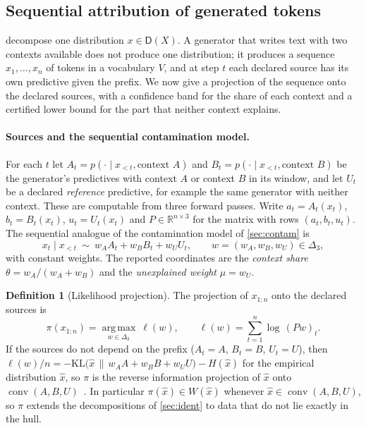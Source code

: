 \documentclass[11pt]{article}
\theoremstyle{definition}
\newtheorem{definition}[theorem]{Definition}
\theoremstyle{remark}
\newcommand{\D}{\mathsf{D}}
\begin{document}
\subsection{Sequential attribution of generated tokens}\label{sec:seqattr}

 decompose one distribution $x\in\D(X)$. A generator that writes text
with two contexts available does not produce one distribution; it produces a sequence
$x_1,\dots,x_n$ of tokens in a vocabulary $V$, and at step $t$ each declared source has its own
predictive given the prefix. We now give a projection of the sequence onto the declared sources,
with a confidence band for the share of each context and a certified lower bound for the part that
neither context explains.

\paragraph{Sources and the sequential contamination model.} For each $t$ let
$A_t=p(\cdot\mid x_{<t},\text{context }A)$ and $B_t=p(\cdot\mid x_{<t},\text{context }B)$ be the
generator's predictives with context $A$ or context $B$ in its window, and let $U_t$ be a declared
\emph{reference} predictive, for example the same generator with neither context. These are
computable from three forward passes. Write $a_t=A_t(x_t)$, $b_t=B_t(x_t)$, $u_t=U_t(x_t)$ and
$P\in\mathbb{R}^{n\times3}$ for the matrix with rows $(a_t,b_t,u_t)$. The sequential analogue of the
contamination model of \cref{sec:contam} is
\[
x_t\mid x_{<t}\ \sim\ w_AA_t+w_BB_t+w_UU_t,\qquad w=(w_A,w_B,w_U)\in\Delta_3,
\]
with constant weights. The reported coordinates are the \emph{context share}
$\theta=w_A/(w_A+w_B)$ and the \emph{unexplained weight} $\mu=w_U$.

\begin{definition}[Likelihood projection]\label{def:likproj}
The projection of $x_{1:n}$ onto the declared sources is
\[
\pi(x_{1:n})=\operatorname*{arg\,max}_{w\in\Delta_3}\ \ell(w),\qquad
\ell(w)=\sum_{t=1}^n\log\,(Pw)_t .
\]
If the sources do not depend on the prefix ($A_t=A$, $B_t=B$, $U_t=U$), then
$\ell(w)/n=-\mathrm{KL}\big(\hat x\,\|\,w_AA+w_BB+w_UU\big)-H(\hat x)$ for the empirical distribution
$\hat x$, so $\pi$ is the reverse information projection of $\hat x$ onto
$\operatorname{conv}(A,B,U)$~\cite{Csiszar1975}. In particular $\pi(\hat x)\in W(\hat x)$ whenever
$\hat x\in\operatorname{conv}(A,B,U)$, so $\pi$ extends the decompositions of \cref{sec:ident} to data
that do not lie exactly in the hull.
\end{definition}
\end{document}
